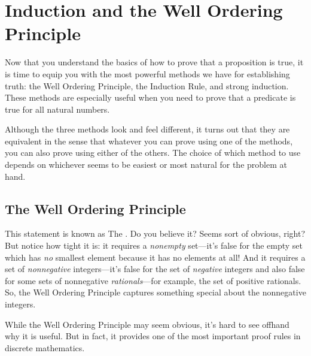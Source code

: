 \chapter{Induction and the Well Ordering Principle}\label{induction_chap}

Now that you understand the basics of how to prove that a proposition
is true, it is time to equip you with the most powerful methods we
have for establishing truth: the Well Ordering Principle, the
Induction Rule, and strong induction.  These methods are especially
useful when you need to prove that a predicate is true for all natural
numbers.

Although the three methods look and feel different, it turns out that
they are equivalent in the sense that whatever you can prove using one
of the methods, you can also prove using either of the others.  The
choice of which method to use depends on whichever seems to be easiest
or most natural for the problem at hand.

\section{The Well Ordering Principle}\label{well_ordering_sec}


This statement is known as The .  Do you
believe it?  Seems sort of obvious, right?  But notice how tight it is: it
requires a \emph{nonempty} set---it's false for the empty set which has
\emph{no} smallest element because it has no elements at all!  And it
requires a set of \emph{nonnegative} integers---it's false for the set of
\emph{negative} integers and also false for some sets of nonnegative
\emph{rationals}---for example, the set of positive rationals.  So, the
Well Ordering Principle captures something special about the nonnegative
integers.


While the Well Ordering Principle may seem obvious, \iffalse it looks
nothing like the induction axiom, and\fi it's hard to see offhand why it
is useful.  But in fact, it provides one of the most important proof rules
in discrete mathematics.  \iffalse We'll explain this after we introduce a
template for well ordering principle proofs resembling the template in
Section~\ref{templ-induct-proofs} for a proof by strong induction.\fi

